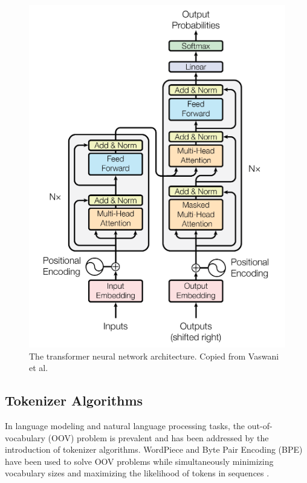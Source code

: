 \documentclass[12pt]{article}
\begin{document}
\begin{figure}[!t]
    \centering
    \includegraphics[width=0.5\linewidth]{figures/transformer_arch.png}
    \caption{The transformer neural network architecture. Copied from Vaswani et al.~\cite{vaswani_attention_2017}}
    \label{fig:transformer_arch}
\end{figure}

\subsection{Tokenizer Algorithms}
In language modeling and natural language processing tasks, the out-of-vocabulary (OOV) problem is prevalent and has been addressed by the
introduction of tokenizer algorithms. WordPiece and Byte Pair Encoding (BPE) have been used to solve OOV problems while simultaneously minimizing
vocabulary sizes and maximizing the likelihood of tokens in sequences \cite{wu_googles_2016,schuster_japanese_2012,sennrich_neural_2016}.
\end{document}

